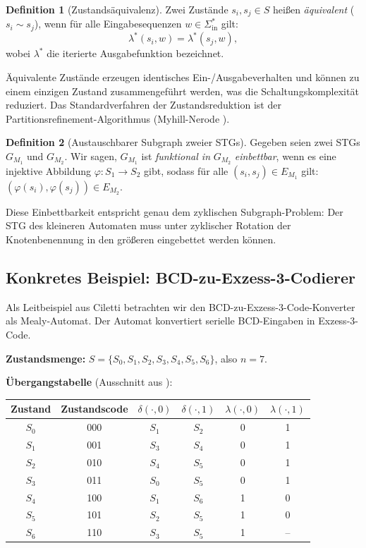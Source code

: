 ﻿\documentclass[a4paper,12pt]{article}
\theoremstyle{definition}
\newtheorem{definition}{Definition}
\begin{document}
\begin{definition}[Zustandsäquivalenz]
  Zwei Zustände $s_i, s_j \in S$ heißen \emph{äquivalent} ($s_i \sim s_j$), wenn für alle
  Eingabesequenzen $w \in \Sigma_{\text{in}}^*$ gilt:
  \[
    \lambda^*(s_i, w) = \lambda^*(s_j, w),
  \]
  wobei $\lambda^*$ die iterierte Ausgabefunktion bezeichnet.
\end{definition}

Äquivalente Zustände erzeugen identisches Ein-/Ausgabeverhalten und können zu einem
einzigen Zustand zusammengeführt werden, was die Schaltungskomplexität reduziert. Das
Standardverfahren der Zustandsreduktion ist der Partitionsrefinement-Algorithmus
(Myhill-Nerode \cite[S.~95]{ciletti2011}).

\begin{definition}[Austauschbarer Subgraph zweier STGs]
  Gegeben seien zwei STGs $G_{M_1}$ und $G_{M_2}$. Wir sagen, $G_{M_1}$ ist
  \emph{funktional in} $G_{M_2}$ \emph{einbettbar}, wenn es eine injektive Abbildung
  $\varphi: S_1 \to S_2$ gibt, sodass für alle $(s_i, s_j) \in E_{M_1}$ gilt:
  $(\varphi(s_i), \varphi(s_j)) \in E_{M_2}$.
\end{definition}

Diese Einbettbarkeit entspricht genau dem zyklischen Subgraph-Problem: Der STG des
kleineren Automaten muss unter zyklischer Rotation der Knotenbenennung in den größeren
eingebettet werden können.

\subsection{Konkretes Beispiel: BCD-zu-Exzess-3-Codierer}

Als Leitbeispiel aus Ciletti \cite[S.~84--98]{ciletti2011} betrachten wir den
BCD-zu-Exzess-3-Code-Konverter als Mealy-Automat. Der Automat konvertiert serielle
BCD-Eingaben in Exzess-3-Code.

\textbf{Zustandsmenge:} $S = \{S_0, S_1, S_2, S_3, S_4, S_5, S_6\}$, also $n = 7$.

\textbf{Übergangstabelle} (Ausschnitt aus \cite[S.~85]{ciletti2011}):

\begin{center}
\begin{tabular}{cccccc}
  \toprule
  Zustand & Zustandscode & $\delta(\cdot, 0)$ & $\delta(\cdot, 1)$ & $\lambda(\cdot, 0)$ & $\lambda(\cdot, 1)$ \\
  \midrule
  $S_0$ & 000 & $S_1$ & $S_2$ & 0 & 1 \\
  $S_1$ & 001 & $S_3$ & $S_4$ & 0 & 1 \\
  $S_2$ & 010 & $S_4$ & $S_5$ & 0 & 1 \\
  $S_3$ & 011 & $S_0$ & $S_5$ & 0 & 1 \\
  $S_4$ & 100 & $S_1$ & $S_6$ & 1 & 0 \\
  $S_5$ & 101 & $S_2$ & $S_5$ & 1 & 0 \\
  $S_6$ & 110 & $S_3$ & $S_5$ & 1 & -- \\
  \bottomrule
\end{tabular}
\end{center}
\end{document}

